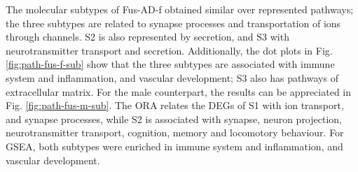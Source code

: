 The molecular subtypes of Fus-AD-f obtained similar over represented pathways; the three subtypes are related to synapse processes and transportation of ions through channels. S2 is also represented by secretion, and S3 with neurotransmitter transport and secretion. Additionally, the dot plots in Fig. \ref{fig:path-fus-f-sub} show that the three subtypes are associated with immune system and inflammation, and vascular development; S3 also has pathways of extracellular matrix. For the male counterpart, the results can be appreciated in Fig. \ref{fig:path-fus-m-sub}. The ORA relates the DEGs of S1 with ion transport, and synapse processes, while S2 is associated with synapse, neuron projection, neurotransmitter transport, cognition, memory and locomotory behaviour. For GSEA, both subtypes were enriched in immune system and inflammation, and vascular development.

